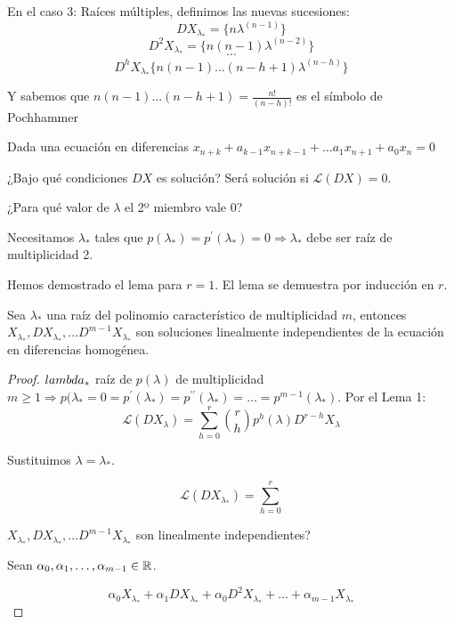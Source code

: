       En el caso 3: Raíces múltiples, definimos las nuevas sucesiones:
$$ DX_{\lambda_*} =\{n\lambda^{(n-1)}\}$$
$$ D^2X_{\lambda_*}= \{n(n-1)\lambda^{(n-2)}\} $$
$$ \cdots $$
$$ D^hX_{\lambda_*}\{n(n-1)...(n-h+1)\lambda^{(n-h)}\}$$

Y sabemos que $n(n-1)...(n-h+1) = \frac{n!}{(n-h)!}$ es el símbolo de Pochhammer

Dada una ecuación en diferencias
$x_{n+k} + a_{k-1}x_{n+k-1} + \hdots a _1x_{n+1} + a_0x_n = 0$



¿Bajo qué condiciones $DX$ es solución? Será solución si $\mathcal{L}(DX) = 0$.

¿Para qué valor de $\lambda$ el 2º miembro vale 0?

Necesitamos $\lambda_{\ast}$ tales que
$p(\lambda_{\ast}) = p^{\prime}(\lambda_{\ast}) = 0 \Rightarrow \lambda_{\ast}$
debe ser raíz de multiplicidad 2.

Hemos demostrado el lema para $r = 1$. El lema se demuestra por inducción en
$r$.

\begin{nprop}[Lema]
  Sea $\lambda_{\ast}$ una raíz del polinomio característico de multiplicidad
  $m$, entonces
  $X_{\lambda_{\ast}}, DX_{\lambda_{\ast}}, \hdots D^{m-1}X_{\lambda_{\ast}}$
  son soluciones linealmente independientes de la ecuación en diferencias
  homogénea.
\end{nprop}

\begin{proof}
  $\\lambda_{\ast}$ raíz de $p(\lambda)$ de multiplicidad
  $m \geq 1 \Rightarrow p(\lambda_{\ast} = 0 = p^{\prime}(\lambda_{\ast}) =
  p^{\prime \prime}(\lambda_{\ast}) = \hdots = p^{m-1}(\lambda_{\ast})$. Por el
  Lema 1:
	$$ \mathcal{L}(DX_{\lambda}) = \sum_{h = 0}^r \binom{r}{h}p^h(\lambda)D^{r-h}X_{\lambda}$$

	Sustituimos $\lambda = \lambda_{\ast}$.

	$$\mathcal{L}(DX_{\lambda_{\ast}}) = \sum_{h = 0}^{r}$$

	$X_{\lambda_{\ast}}, DX_{\lambda_{\ast}}, \hdots
        D^{m-1}X_{\lambda_{\ast}}$ son linealmente independientes?

	Sean $\alpha_0, \alpha_1, \hdots, \alpha_{m-1} \in \mathbb{R}$.

	$$\alpha_0X_{\lambda_{\ast}} + \alpha_1DX_{\lambda_{\ast}} + \alpha_0D^2X_{\lambda_{\ast}} + \hdots + \alpha_{m-1}X_{\lambda_{\ast}}$$


      \end{proof}

